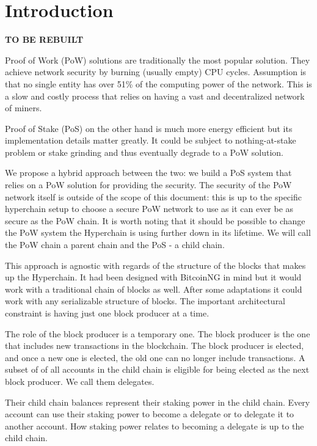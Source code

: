 
\section{Introduction}

\textbf{TO BE REBUILT}

Proof of Work (PoW) solutions are traditionally the most popular solution. They achieve network security by burning (usually empty) CPU cycles. Assumption is that no single entity has over 51\% of the computing power of the network. This is a slow and costly process that relies on having a vast and decentralized network of miners.

Proof of Stake (PoS) on the other hand is much more energy efficient but its implementation details matter greatly. It could be subject to nothing-at-stake problem or stake grinding and thus eventually degrade to a PoW solution.

We propose a hybrid approach between the two: we build a PoS system that relies on a PoW solution for providing the security. The security of the PoW network itself is outside of the scope of this document: this is up to the specific hyperchain setup to choose a secure PoW network to use as it can ever be as secure as the PoW chain. It is worth noting that it should be possible to change the PoW system the Hyperchain is using further down in its lifetime. We will call the PoW chain a parent chain and the PoS - a child chain.

This approach is agnostic with regards of the structure of the blocks that makes up the Hyperchain. It had been designed with BitcoinNG in mind but it would work with a traditional chain of blocks as well. After some adaptations it could work with any serializable structure of blocks. The important architectural constraint is having just one block producer at a time.

The role of the block producer is a temporary one. The block producer is the one that includes new transactions in the blockchain. The block producer is elected, and once a new one is elected, the old one can no longer include transactions. A subset of of all accounts in the child chain is eligible for being elected as the next block producer. We call them delegates.

Their child chain balances represent their staking power in the child chain. Every account can use their staking power to become a delegate or to delegate it to another account. How staking power relates to becoming a delegate is up to the child chain.


